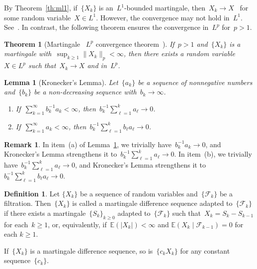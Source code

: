 \documentclass[12pt,a4paper]{article}  %
\newcounter{cite}
\newtheorem{theorem}{Theorem}[section]
\newtheorem{lemma}{Lemma}[section]
\theoremstyle{definition}
\newtheorem{definition}{Definition}[section]
\newtheorem{remark}{Remark}[section]
\numberwithin{equation}{section}
\newcommand{\FF}{\mathcal{F}}
\newcommand{\as}{{\text{a.s.}}\xspace}
\begin{document}
By Theorem~\ref{th:ml1}, if~$\{X_k\}$ is an~$L^1$-bounded martingale,
then~$X_k\to X$~\as for some random variable~$X\in L^1$. However, the convergence may not hold
in~$L^1$. See~\cite[Example~4.2.13]{Durrett_2019}. In contrast, the following theorem ensures
the convergence in~$L^p$ for~$p>1$.

\begin{theorem}[Martingale ~$L^p$ convergence theorem~\mbox{\cite[Theorem~4.4.6]{Durrett_2019}}] \label{th:mlp}
    If~$p> 1$ and~$\{X_k\}$ is a martingale with~$\sup_{k\ge 1} \|X_k\|_p< \infty$,
    then there exists a random variable~$X\in L^p$ such that~$X_k\to X$ \as and in~$L^p$.
\end{theorem}

\begin{lemma}[Kronecker's Lemma]
    \label{lem:kronecker}
    Let~$\{a_k\}$ be a sequence of nonnegative numbers and~$\{b_k\}$ be a non-decreasing sequence
    with~$b_k\to \infty$.
    \begin{enumerate}
        \item If~$\sum_{k=1}^\infty b_k^{-1}a_k < \infty$, then~$b_k^{-1}\sum_{\ell=1}^k a_\ell\to 0$.
        \item If~$\sum_{k=1}^\infty a_k < \infty$, then~$b_k^{-1}\sum_{\ell=1}^k b_\ell a_\ell\to 0$.
    \end{enumerate}
\end{lemma}

\begin{remark}
    \label{rem:kronecker}
    In item~(a) of Lemma~\ref{lem:kronecker}, we trivially have~$b_k^{-1} a_k\to 0$,
    and Kronecker's Lemma strengthens it to~$b_k^{-1}\sum_{\ell=1}^k a_\ell\to 0$.
    In item~(b), we trivially have~$b_k^{-1} \sum_{\ell=1}^k a_\ell\to 0$,
    and Kronecker's Lemma strengthens it to~$b_k^{-1}\sum_{\ell=1}^k b_\ell a_\ell\to 0$.
\end{remark}

\begin{definition}
    \label{def:md}
    Let $\{X_k\}$ be a sequence of random variables and~$\{\FF_k\}$ be a filtration.
    Then~$\{X_k\}$ is called a martingale difference sequence
    adapted to~$\{\FF_k\}$ if there exists a martingale~$\{S_k\}_{k\ge 0}$ adapted to~$\{\FF_k\}$
    such that~$X_k = S_k - S_{k-1}$ for each~$k\ge 1$, or, equivalently,
    if~$\mathbb{E}(|X_k|) < \infty$ and $\mathbb{E}(X_k \mathrel{|} \FF_{k-1}) = 0$ \as for each $k \ge 1$.
\end{definition}

If~$\{X_k\}$ is a martingale difference sequence, so is~$\{c_kX_k\}$ for any constant
sequence~$\{c_k\}$.
\end{document}
